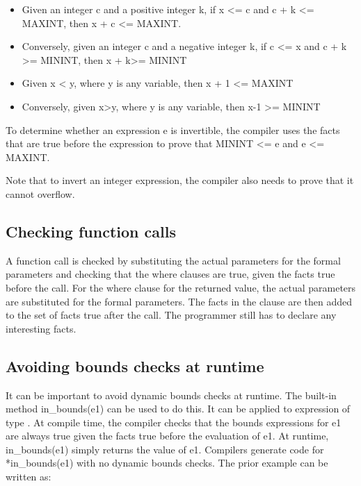 \begin{itemize}
\item
  Given an integer c and a positive integer k, if x \textless{}= c and c
  + k \textless{}= MAXINT, then x + c \textless{}= MAXINT.
\item
  Conversely, given an integer c and a negative integer k, if c
  \textless{}= x and c + k \textgreater{}= MININT, then x +
  k\textgreater{}= MININT
\item
  Given x \textless{} y, where y is any variable, then x + 1
  \textless{}= MAXINT
\item
  Conversely, given x\textgreater{}y, where y is any variable, then x-1
  \textgreater{}= MININT
\end{itemize}

To determine whether an expression e is invertible, the compiler uses
the facts that are true before the expression to prove that MININT
\textless{}= e and e \textless{}= MAXINT.

Note that to invert an integer expression, the compiler also needs to
prove that it cannot overflow.

\subsection{Checking function calls}\label{checking-function-calls}

A function call is checked by substituting the actual parameters for the
formal parameters and checking that the where clauses are true, given
the facts true before the call. For the where clause for the returned
value, the actual parameters are substituted for the formal parameters.
The facts in the clause are then added to the set of facts true after
the call. The programmer still has to declare any interesting facts.

\subsection{Avoiding bounds checks at runtime}\label{avoiding-bounds-checks-at-runtime}

It can be important to avoid dynamic bounds checks at runtime. The
built-in method in\_bounds(e1) can be used to do this. It can be applied
to expression of type \arrayptr. At compile time, the compiler
checks that the bounds expressions for e1 are always true given the
facts true before the evaluation of e1. At runtime, in\_bounds(e1)
simply returns the value of e1. Compilers generate code for
*in\_bounds(e1) with no dynamic bounds checks. The prior example can be
written as:

